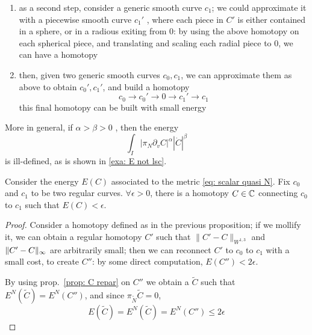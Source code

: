 \documentclass[twoside,a4paper,english]{article}
\def\derpar#1{\partial_{#1}}
\begin{document}
\begin{Proposition}
\begin{enumerate}
\begin{itemize}
   since by \eqref{eq: den pos} the integrand is continuous and 
   positive, and it decreases pointwise when $\e\to 0$, then
   so $E^N(C_k)\to 0$ as $\e\to 0$ (by Beppo-Levi lemma,
   or Lebesgue theorem).
   

 \end{itemize}

\item 
as a second step, consider a generic smooth curve $c_1$; we could
approximate it with a piecewise smooth curve $c_1'$ , where
each piece in $C'$ is either contained in a sphere, or in a radious
exiting from $0$: by using the above homotopy on each spherical piece,
and translating and scaling each radial piece to $0$, we can
have a homotopy 


\item then, given two generic smooth curves $c_0,c_1$, we can
  approximate them as above to obtain $c_0',c_1'$, and build
  a homotopy
  $$ c_0 \to c_0' \to 0 \to c_1' \to c_1$$
  this final homotopy can be built with small energy
\end{enumerate}
\end{Proposition}

\begin{Remark}
  \def\a{\alpha} \def\b{\beta} 
  More in general, if  $\a>\b>0$ , then the energy
  \[ \int_I |\pi_{N}\derpar v C |^\a |\dot C|^\b \]
  is ill-defined, as is shown in \ref{exa: E not lsc}.
\end{Remark}





\begin{Proposition}\label{inf E 0}
  \def\e{\epsilon}
  Consider the energy $E(C)$ associated to the metric 
  \eqref{eq: scalar quasi N}.
  Fix $c_0$ and   $c_1$ to be two regular curves.
  $\forall \e>0$, there is a homotopy $C\in \mathbb C$
  connecting $c_0$ to $c_1$ such that $E(C)<\e$.
  \begin{proof}
    Consider a homotopy defined as in the previous proposition; if we
    mollify it, 
    we can obtain a regular homotopy $C'$ such that
    $\|C'-C\|_{W^{1,3}}$ and $\|C'-C\|_{\infty}$ are arbitrarily
    small; then we can reconnect $C'$ to $c_0$ to $c_1$ with a small
    cost, to create $C''$: by some direct
    computation, $E(C'')<2\e$.

    By using prop.~\ref{prop: C repar} on $C''$
    we obtain a $\widetilde C$ such that $E^N(\widetilde C)=E^N(C'')$, and
    since $\pi_{\widetilde N}\widetilde C=0$,
    $$E(\widetilde C)=E^N(\widetilde C)=E^N(C'')\le 2\e$$
  \end{proof}
\end{Proposition}
\end{document}
